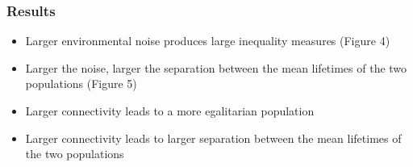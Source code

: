 \documentclass{beamer}
\begin{document}
%
%

\begin{frame}[t]
\frametitle{Results}
\begin{itemize}
\item Larger environmental noise produces large inequality measures (Figure 4)
\item Larger the noise, larger the separation between the mean lifetimes of the two populations (Figure 5) 
\item Larger connectivity leads to a more egalitarian population
\item Larger connectivity leads to larger separation between the mean lifetimes of the two populations
\end{itemize}

\end{frame}
\end{document}
